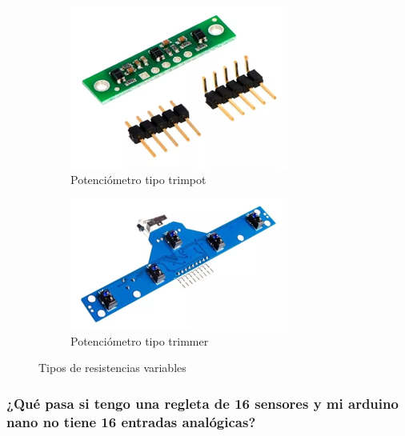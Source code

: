 \documentclass[a4paper,11pt]{report}    %
\begin{document}
\begin{figure}[H]
    \medskip %

    \begin{subfigure}[t]{0.475\textwidth}
        \includegraphics[width=\textwidth]{img/16.png}
        \caption{Potenciómetro tipo trimpot}
        \label{subfig:example-image-d}
    \end{subfigure}%
    \hfill
    \begin{subfigure}[t]{0.475\textwidth}
        \includegraphics[width=\textwidth]{img/17.png}
        \caption{Potenciómetro tipo trimmer}
        \label{subfig:example-image-e}
    \end{subfigure}

    \caption{Tipos de resistencias variables}
    \label{fig:test_subfigure}
\end{figure}

\subsubsection{¿Qué pasa si tengo una regleta de 16 sensores y mi arduino nano no tiene 16 entradas analógicas? }
\end{document}
